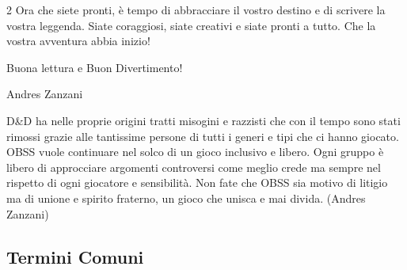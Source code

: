 \begin{multicols}{2}
Ora che siete pronti, è tempo di abbracciare il vostro destino e di scrivere la vostra leggenda. Siate coraggiosi, siate creativi e siate pronti a tutto. Che la vostra avventura abbia inizio!

\begin{center}
Buona lettura e Buon Divertimento!
\end{center}

\begin{flushright}
Andres Zanzani
\end{flushright}

\end{multicols}

\vfill

\begin{enfasi}
D\&D ha nelle proprie origini tratti misogini e razzisti che con il tempo sono stati rimossi grazie alle tantissime persone di tutti i generi e tipi che ci hanno giocato.
OBSS vuole continuare nel solco di un gioco inclusivo e libero. Ogni gruppo è libero di approcciare argomenti controversi come meglio crede ma sempre nel rispetto di ogni giocatore e sensibilità. Non fate che OBSS sia motivo di litigio ma di unione e spirito fraterno, un gioco che unisca e mai divida. (Andres Zanzani)
\end{enfasi}

\pagebreak

\subsection{Termini Comuni}\label{termini-comuni}

